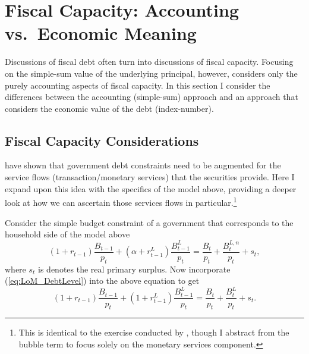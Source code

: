 \documentclass[11pt,a4paper,margin=1.5in]{article}
\begin{document}





\section{Fiscal Capacity: Accounting vs.\ Economic Meaning}
Discussions of fiscal debt often turn into discussions of fiscal capacity.
Focusing on the simple-sum value of the underlying principal, however, considers only the purely accounting aspects of fiscal capacity.
In this section I consider the differences between the accounting (simple-sum) approach and an approach that considers the economic value of the debt (index-number).

\subsection{Fiscal Capacity Considerations}
\label{subsec:Theory_Capacity}
\citet*{Brunnermeier-Merkel-Sannikov:2022} have shown that government debt constraints need to be augmented for the service flows (transaction/monetary services) that the securities provide.
Here I expand upon this idea with the specifics of the model above, providing a deeper look at how we can ascertain those services flows in particular.\footnote{
	This is identical to the exercise conducted by \citet{Brunnermeier-Merkel-Sannikov:2020}, though I abstract from the bubble term to focus solely on the monetary services component.}

	Consider the simple budget constraint of a government that corresponds to the household side of the model above
\begin{equation*}
	(1+r_{t-1})\frac{B_{t-1}}{p_t} + (\alpha + r^L_{t-1})\frac{B^L_{t-1}}{p_t} = \frac{B_t}{p_t} + \frac{B^{L,n}_t}{p_t} + s_t,
\end{equation*}
where $s_t$ is denotes the real primary surplus. 
Now incorporate (\ref{eq:LoM_DebtLevel}) into the above equation to get
\begin{equation}
	(1+r_{t-1})\frac{B_{t-1}}{p_t} + (1 + r^L_{t-1})\frac{B^L_{t-1}}{p_t} = \frac{B_t}{p_t} + \frac{B^{L}_t}{p_t} + s_t.
	\label{eq:Gov_PeriodBudget}
\end{equation}
\end{document}
